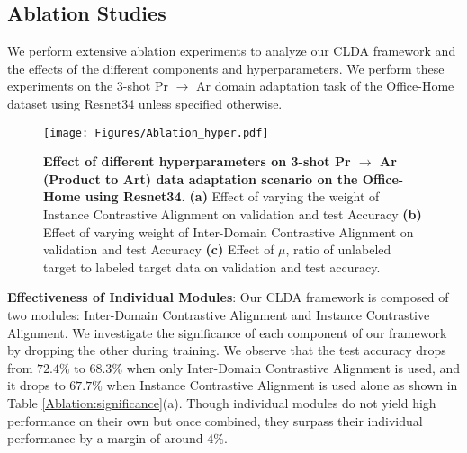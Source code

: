 \subsection{Ablation Studies}
\label{ablation}
We perform extensive ablation experiments to analyze our CLDA framework and the effects of the different components and hyperparameters. We perform these experiments on the 3-shot Pr $\rightarrow$ Ar domain adaptation task of the Office-Home dataset using Resnet34 unless specified otherwise. 

\begin{table}[ht]
\renewcommand{\arraystretch}{1.2}
    \centering
    \caption{\textbf{Effect of Strong Augmentations} Numbers show the test accuracy on 3-shot domain adaptation tasks of the Office-Home dataset with Resnet34 with different augmentation policies.}
    \label{tab:Augmentation}
\end{table}

\begin{figure}
    \centering
    \texttt{[image: Figures/Ablation\_hyper.pdf]}
    \caption{\textbf{Effect of different hyperparameters on 3-shot Pr $\rightarrow$ Ar (Product to Art) data adaptation scenario on the Office-Home using Resnet34.} \textbf{(a)} Effect of varying the weight of Instance Contrastive Alignment on validation and test Accuracy \textbf{(b)} Effect of varying weight of Inter-Domain Contrastive Alignment on validation and test Accuracy \textbf{(c)} Effect of $\mu$, ratio of unlabeled target to labeled target data on validation and test accuracy.}
    \label{fig:hyperparameters}
\end{figure}
\noindent\textbf{Effectiveness of  Individual Modules}: Our CLDA framework is composed of two modules: Inter-Domain Contrastive Alignment and Instance Contrastive Alignment. We investigate the significance of each component of our framework by dropping the other during training. We observe that the test accuracy drops from $72.4\%$ to $68.3\%$ when only Inter-Domain Contrastive Alignment is used, and it drops to $67.7\%$ when Instance Contrastive Alignment is used alone as shown in Table \ref{Ablation:significance}(a). Though individual modules do not yield high performance on their own but once combined, they surpass their individual performance by a margin of around $4\%$.

